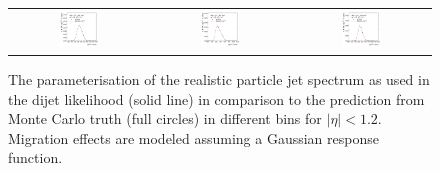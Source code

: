 \begin{figure}[ht]
\begin{tabular}{ccc}
    \includegraphics[width=0.3\textwidth]{figures/ResFit_Spring10QCDFlat_Gauss_Eta0_Spectrum_PtBin10} &
    \includegraphics[width=0.3\textwidth]{figures/ResFit_Spring10QCDFlat_Gauss_Eta0_Spectrum_PtBin11} &
    \includegraphics[width=0.3\textwidth]{figures/ResFit_Spring10QCDFlat_Gauss_Eta0_Spectrum_PtBin12} \\
  \end{tabular}
\caption{The parameterisation of the realistic particle jet \pt spectrum as used in the dijet likelihood (solid line) in comparison to the prediction from Monte Carlo truth (full circles) in different \pt bins for \mbox{$|\eta|<1.2$}. Migration effects are modeled assuming a Gaussian response function.}
\label{fig:ResFit:App:Gauss:Spectrum}
\end{figure}


